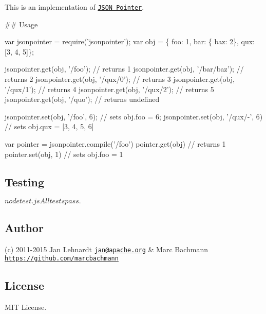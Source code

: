 This is an implementation of \href{http://tools.ietf.org/html/draft-ietf-appsawg-json-pointer-08}{\tt J\+S\+ON Pointer}.

\#\# Usage 
\begin{DoxyCode}
var jsonpointer = require('jsonpointer');
var obj = \{ foo: 1, bar: \{ baz: 2\}, qux: [3, 4, 5]\};

jsonpointer.get(obj, '/foo');     // returns 1
jsonpointer.get(obj, '/bar/baz'); // returns 2
jsonpointer.get(obj, '/qux/0');   // returns 3
jsonpointer.get(obj, '/qux/1');   // returns 4
jsonpointer.get(obj, '/qux/2');   // returns 5
jsonpointer.get(obj, '/quo');     // returns undefined

jsonpointer.set(obj, '/foo', 6);  // sets obj.foo = 6;
jsonpointer.set(obj, '/qux/-', 6) // sets obj.qux = [3, 4, 5, 6]

var pointer = jsonpointer.compile('/foo')
pointer.get(obj)    // returns 1
pointer.set(obj, 1) // sets obj.foo = 1
\end{DoxyCode}


\subsection*{Testing}

\begin{DoxyVerb}$ node test.js
All tests pass.
$
\end{DoxyVerb}


\href{https://travis-ci.org/janl/node-jsonpointer}{\tt }

\subsection*{Author}

(c) 2011-\/2015 Jan Lehnardt \href{mailto:jan@apache.org}{\tt jan@apache.\+org} \& Marc Bachmann \href{https://github.com/marcbachmann}{\tt https\+://github.\+com/marcbachmann}

\subsection*{License}

M\+IT License. 